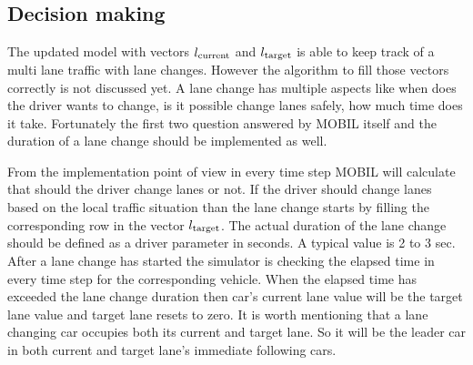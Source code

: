 		\subsection*{Decision making}
		The updated model with vectors $l_{\rm current}$ and $l_{\rm target}$ is able to keep track of a multi lane traffic with lane changes. However the algorithm to fill those vectors correctly is not discussed yet. A lane change has multiple aspects like when does the driver wants to change, is it possible change lanes safely, how much time does it take. Fortunately the first two question answered by MOBIL itself and the duration of a lane change should be implemented as well.

		From the implementation point of view in every time step MOBIL will calculate that should the driver change lanes or not. If the driver should change lanes based on the local traffic situation than the lane change starts by filling the corresponding row in the vector $l_{\rm target}$. The actual duration of the lane change should be defined as a driver parameter in seconds. A typical value is 2 to 3 sec. After a lane change has started the simulator is checking the elapsed time in every time step for the corresponding vehicle. When the elapsed time has exceeded the lane change duration then car's current lane value will be the target lane value and target lane resets to zero. It is worth mentioning that a lane changing car occupies both its current and target lane. So it will be the leader car in both current and target lane's immediate following cars.